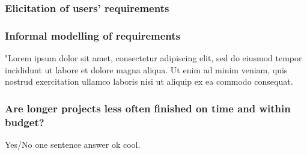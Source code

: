 \documentclass[letterpaper,12pt]{article}
\begin{document}
\subsubsection{Elicitation of users' requirements}
\lipsum[75]
\subsubsection{Informal modelling of requirements}
"Lorem ipsum dolor sit amet, consectetur adipiscing elit, sed do eiusmod tempor incididunt ut labore et dolore magna aliqua. Ut enim ad minim veniam, quis nostrud exercitation ullamco laboris nisi ut aliquip ex ea commodo consequat.
\subsubsection{Are longer projects less often finished on time and within budget?}
Yes/No one sentence answer ok cool.
\end{document}
